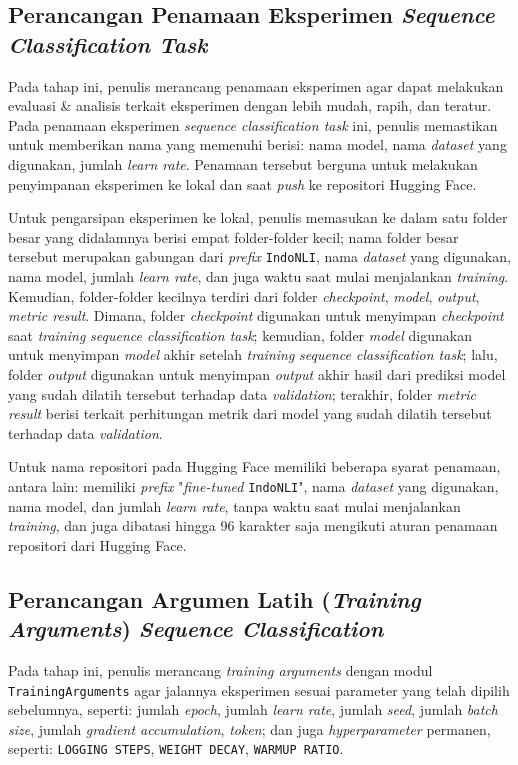 \subsection{Perancangan Penamaan Eksperimen \emph{Sequence Classification Task}}
\label{4.1.7}
Pada tahap ini, penulis merancang penamaan eksperimen agar dapat melakukan evaluasi \& analisis terkait eksperimen dengan lebih mudah, rapih, dan teratur. Pada penamaan eksperimen \emph{sequence classification task} ini, penulis memastikan untuk memberikan nama yang memenuhi berisi: nama model, nama \emph{dataset} yang digunakan, jumlah \emph{learn rate}. Penamaan tersebut berguna untuk melakukan penyimpanan eksperimen ke lokal dan saat \emph{push} ke repositori Hugging Face. 

Untuk pengarsipan eksperimen ke lokal, penulis memasukan ke dalam satu folder besar yang didalamnya berisi empat folder-folder kecil; nama folder besar tersebut merupakan gabungan dari \emph{prefix} \texttt{IndoNLI}, nama \emph{dataset} yang digunakan, nama model, jumlah \emph{learn rate}, dan juga waktu saat mulai menjalankan \emph{training}. Kemudian, folder-folder kecilnya terdiri dari folder \emph{checkpoint}, \emph{model}, \emph{output}, \emph{metric result}. Dimana, folder \emph{checkpoint} digunakan untuk menyimpan \emph{checkpoint} saat \emph{training} \emph{sequence classification task}; kemudian, folder \emph{model} digunakan untuk menyimpan \emph{model} akhir setelah \emph{training} \emph{sequence classification task}; lalu, folder \emph{output} digunakan untuk menyimpan \emph{output} akhir hasil dari prediksi model yang sudah dilatih tersebut terhadap data \emph{validation}; terakhir, folder \emph{metric result} berisi terkait perhitungan metrik dari model yang sudah dilatih tersebut terhadap data \emph{validation}.

Untuk nama repositori pada Hugging Face memiliki beberapa syarat penamaan, antara lain: memiliki \emph{prefix} "\emph{fine-tuned} \texttt{IndoNLI}", nama \emph{dataset} yang digunakan, nama model, dan jumlah \emph{learn rate}, tanpa waktu saat mulai menjalankan \emph{training}, dan juga dibatasi hingga 96 karakter saja mengikuti aturan penamaan repositori dari Hugging Face.

\subsection{Perancangan Argumen Latih (\emph{Training Arguments}) \emph{Sequence Classification}}
\label{4.1.8}
Pada tahap ini, penulis merancang \emph{training arguments} dengan modul \texttt{TrainingArguments} agar jalannya eksperimen sesuai parameter yang telah dipilih sebelumnya, seperti: jumlah \emph{epoch}, jumlah \emph{learn rate}, jumlah \emph{seed}, jumlah \emph{batch size}, jumlah \emph{gradient accumulation}, \emph{token}; dan juga \emph{hyperparameter} permanen, seperti:  \texttt{LOGGING STEPS}, \texttt{WEIGHT DECAY}, \texttt{WARMUP RATIO}. 

